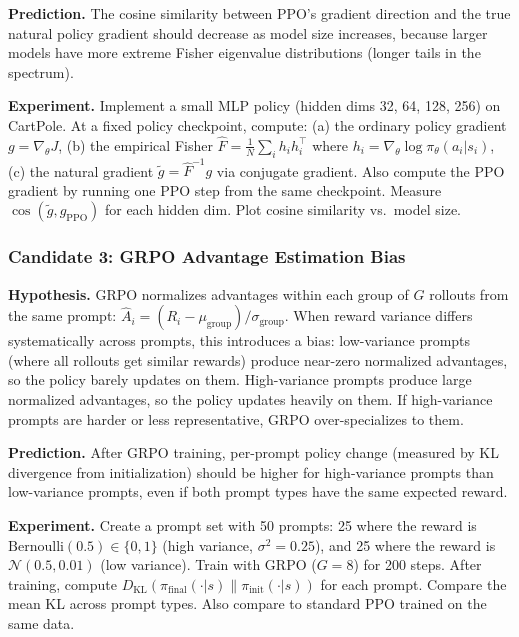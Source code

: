 \textbf{Prediction.} The cosine similarity between PPO's gradient direction and the true natural policy gradient should decrease as model size increases, because larger models have more extreme Fisher eigenvalue distributions (longer tails in the spectrum).

\textbf{Experiment.} Implement a small MLP policy (hidden dims 32, 64, 128, 256) on CartPole. At a fixed policy checkpoint, compute: (a) the ordinary policy gradient $g = \nabla_\theta J$, (b) the empirical Fisher $\hat{F} = \frac{1}{N} \sum_i h_i h_i^\top$ where $h_i = \nabla_\theta \log \pi_\theta(a_i|s_i)$, (c) the natural gradient $\tilde{g} = \hat{F}^{-1} g$ via conjugate gradient. Also compute the PPO gradient by running one PPO step from the same checkpoint. Measure $\cos(\tilde{g}, g_{\mathrm{PPO}})$ for each hidden dim. Plot cosine similarity vs.\ model size.

\subsubsection{Candidate 3: GRPO Advantage Estimation Bias}

\textbf{Hypothesis.} GRPO normalizes advantages within each group of $G$ rollouts from the same prompt: $\hat{A}_i = (R_i - \mu_{\text{group}}) / \sigma_{\text{group}}$. When reward variance differs systematically across prompts, this introduces a bias: low-variance prompts (where all rollouts get similar rewards) produce near-zero normalized advantages, so the policy barely updates on them. High-variance prompts produce large normalized advantages, so the policy updates heavily on them. If high-variance prompts are harder or less representative, GRPO over-specializes to them.

\textbf{Prediction.} After GRPO training, per-prompt policy change (measured by KL divergence from initialization) should be higher for high-variance prompts than low-variance prompts, even if both prompt types have the same expected reward.

\textbf{Experiment.} Create a prompt set with 50 prompts: 25 where the reward is $\mathrm{Bernoulli}(0.5) \in \{0, 1\}$ (high variance, $\sigma^2 = 0.25$), and 25 where the reward is $\mathcal{N}(0.5, 0.01)$ (low variance). Train with GRPO ($G = 8$) for 200 steps. After training, compute $D_{\mathrm{KL}}(\pi_{\text{final}}(\cdot|s) \| \pi_{\text{init}}(\cdot|s))$ for each prompt. Compare the mean KL across prompt types. Also compare to standard PPO trained on the same data.

